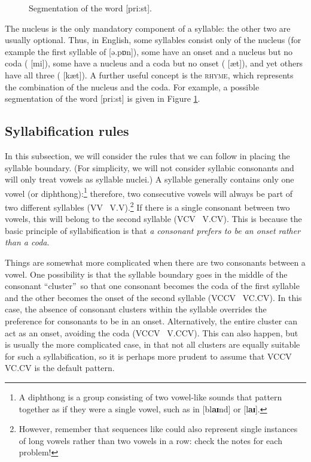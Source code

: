 \begin{refsection}
\begin{figure}
  \caption{Segmentation of the word  [{pri:st}].}
  \label{fig:priest-syllable}
\end{figure}

The nucleus is the only mandatory component of a syllable: the other two are usually optional. Thus, in English, some syllables consist only of the nucleus (for example the first syllable of  [{ə.pɒn}]), some have an onset and a nucleus but no coda ( [{mi}]), some have a nucleus and a coda but no onset ( [{æt}]), and yet others have all three ( [{kæt}]). A further useful concept is the \textsc{rhyme}, which represents the combination of the nucleus and the coda. For example, a possible segmentation of the word  [{pri:st}] is given in Figure \ref{fig:priest-syllable}.

\subsection{Syllabification rules}

In this subsection, we will consider the rules that we can follow in placing the syllable boundary. (For simplicity, we will not consider syllabic consonants and will only treat vowels as syllable nuclei.) A syllable generally contains only one vowel (or diphthong):\footnote{A diphthong is a group consisting of two vowel-like sounds that pattern together as if they were a single vowel, such as in  [{bl\textbf{aɪ}nd}] or  [{l\textbf{aɪ}}].} therefore, two consecutive vowels will always be part of two different syllables (VV \textrightarrow\ V.V).\footnote{However, remember that sequences like  could also represent single instances of long vowels rather than two vowels in a row: check the notes for each problem!} If there is a single consonant between two vowels, this will belong to the second syllable (VCV \textrightarrow\ V.CV). This is because the basic principle of syllabification is that \textit{a consonant prefers to be an onset rather than a coda}.

Things are somewhat more complicated when there are two consonants between a vowel. One possibility is that the syllable boundary goes in the middle of the consonant “cluster”\ so that one consonant becomes the coda of the first syllable and the other becomes the onset of the second syllable (VCCV \textrightarrow\ VC.CV). In this case, the absence of consonant clusters within the syllable overrides the preference for consonants to be in an onset. Alternatively, the entire cluster can act as an onset, avoiding the coda (VCCV \textrightarrow\ V.CCV). This can also happen, but is usually the more complicated case, in that not all clusters are equally suitable for such a syllabification, so it is perhaps more prudent to assume that VCCV \textrightarrow{} VC.CV is the default pattern.


\end{refsection}
